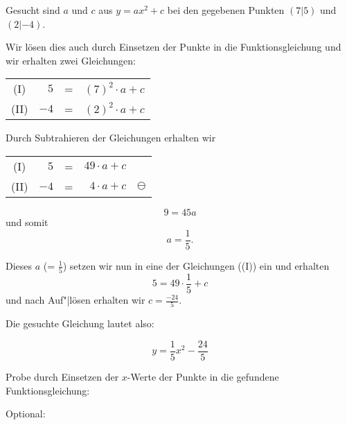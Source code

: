 \begin{rezept}{}{}
  Gesucht sind $a$ und $c$ aus $y = ax^2 + c$ bei den gegebenen
  Punkten $(7|5)$ und $(2|-4)$.

  Wir lösen dies auch durch Einsetzen der Punkte in die
  Funktionsgleichung und wir erhalten zwei Gleichungen:


  \begin{tabular}{c | r  c  r |}
    (I)  &  $5$ & = & $(7)^2\cdot{} a + c$ \\
    (II) & $-4$ & = &  $(2)^2\cdot{} a + c$ \\
  \end{tabular}

  Durch Subtrahieren der Gleichungen erhalten wir

  \begin{tabular}{c | r  c  r | c}
    (I)  &  $5$ & = & $49\cdot{} a + c$ & \,\\
    (II) & $-4$ & = &  $4\cdot{} a + c$ & $\ominus$\\
  \end{tabular}

  $$9 = 45a$$ und somit
  $$a =\frac{1}{5}.$$

  Dieses $a$ (= $\frac{1}{5}$) setzen wir nun in eine der Gleichungen
  (\zB (I)) ein und erhalten
  $$5=49\cdot{}\frac{1}{5} + c$$
  und nach Auf"|lösen erhalten wir $c=\frac{-24}{5}$.

  Die gesuchte Gleichung lautet also:

  $$y = \frac{1}{5}x^2 - \frac{24}{5}$$
\end{rezept}

Probe durch Einsetzen der $x$-Werte der Punkte in die gefundene Funktionsgleichung:

\TNTeop{}
Optional:

